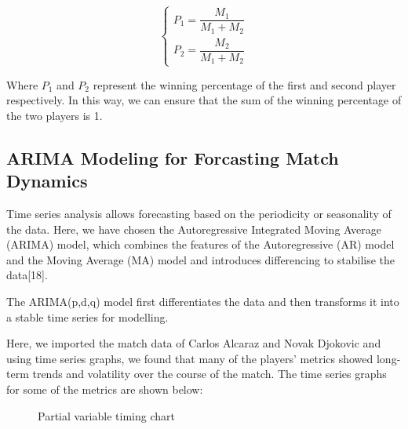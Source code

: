 \documentclass[12pt]{article}  %
\begin{document}
\begin{equation}
	\begin{cases} 
        P_{1}=\dfrac{M_1}{M_1+M_2}\\[10pt]
        P_{2}=\dfrac{M_2}{M_1+M_2} 
    \end{cases}
\end{equation}

Where \(P_1\) and \(P_2\) represent the winning percentage of the first and second player respectively. In this way, we can ensure that the sum of the winning percentage of the two players is 1.

\subsection{ARIMA Modeling for Forcasting Match Dynamics}

Time series analysis allows forecasting based on the periodicity or seasonality of the data. Here, we have chosen the Autoregressive Integrated Moving Average (ARIMA) model, which combines the features of the Autoregressive (AR) model and the Moving Average (MA) model and introduces differencing to stabilise the data[18].

The ARIMA(p,d,q) model first differentiates the data and then transforms it into a stable time series for modelling.

Here, we imported the match data of Carlos Alcaraz and Novak Djokovic and using time series graphs, we found that many of the players' metrics showed long-term trends and volatility over the course of the match. The time series graphs for some of the metrics are shown below:

\begin{figure}[htbp]
    \centering    
    \caption{Partial variable timing chart}		%
    \label{Fig:Flexibility}									%
\end{figure}
\end{document}
